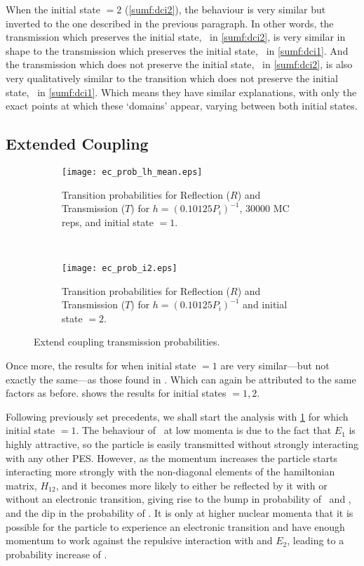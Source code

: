 When the initial state $ = 2 $ (\cref{sumf:dci2}), the behaviour is very similar but inverted to the one described in the previous paragraph. In other words, the transmission which preserves the initial state, \ttt~in \cref{sumf:dci2}, is very similar in shape to the transmission which preserves the initial state, \too~in \cref{sumf:dci1}. And the transmission which does not preserve the initial state, \tot~in \cref{sumf:dci2}, is also very qualitatively similar to the transition which does not preserve the initial state, \tto~in \cref{sumf:dci1}. Which means they have similar explanations, with only the exact points at which these `domains' appear, varying between both initial states.
%
\subsection*{Extended Coupling}
%
\begin{figure}
\begin{subfigure}[t]{0.5\textwidth}
\centering
\texttt{[image: ec\_prob\_lh\_mean.eps]}
\caption[]{Transition probabilities for Reflection ($ R $) and Transmission ($ T $) for $ h = (0.10125 P_{i})^{-1} $, $ 30000 $ MC reps, and initial state $ = 1 $.}
\label{sumf:eci1}
\end{subfigure}
~
\begin{subfigure}[t]{0.5\textwidth}
\centering
\texttt{[image: ec\_prob\_i2.eps]}
\caption[]{Transition probabilities for Reflection ($ R $) and Transmission ($ T $) for $ h = (0.10125 P_{i})^{-1} $ and initial state $ = 2 $.}
\label{sumf:eci2}
\end{subfigure}
\caption[]{Extend coupling transmission probabilities.}\label{sumf:ec}
\end{figure}

Once more, the results for when initial state $ = 1 $ are very similar---but not exactly the same---as those found in \cite{project}. Which can again be attributed to the same factors as before.  shows the results for initial states $ = 1, 2 $.

Following previously set precedents, we shall start the analysis with \cref{sumf:eci1} for which initial state $  = 1 $. The behaviour of \too~at low momenta is due to the fact that $ E_{1} $ is highly attractive, so the particle is easily transmitted without strongly interacting with any other PES. However, as the momentum increases the particle starts interacting more strongly with the non-diagonal elements of the hamiltonian matrix, $ H_{12} $, and it becomes more likely to either be reflected by it with or without an electronic transition, giving rise to the bump in probability of \roo~and \rto, and the dip in the probability of \too. It is only at higher nuclear momenta that it is possible for the particle to experience an electronic transition and have enough momentum to work against the repulsive interaction with and $ E_{2} $, leading to a probability increase of \tto.

